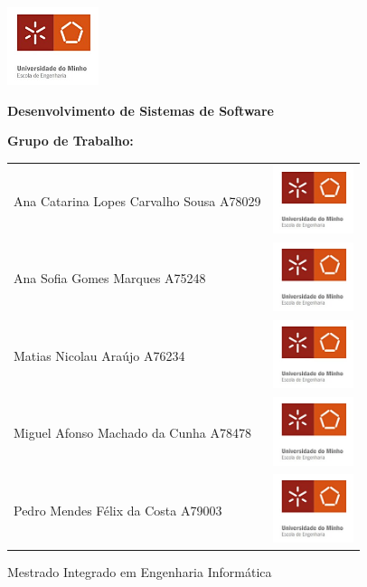 \documentclass[12pt,a4paper]{report}
\begin{document}
\begin{titlepage}
	\includegraphics[width=0.2\textwidth]{UMEng.jpeg}\par\vspace{1cm}
	\begin{center}
		\Large\textbf{Desenvolvimento de Sistemas de Software}\vspace{2cm}
	\end{center}

	\date{}
	\textbf{Grupo de Trabalho:}
	\begin{table}[h]
		\centering
		\label{my-label}
		\begin{tabular}{lr}
		Ana Catarina Lopes Carvalho Sousa A78029 & \includegraphics[height=2cm]{Nacional.png} \\
		Ana Sofia Gomes Marques A75248           & \includegraphics[height=2cm]{Sofia.png}    \\
		Matias Nicolau Araújo A76234             & \includegraphics[height=2cm]{Matias.png}   \\
		Miguel Afonso Machado da Cunha A78478    & \includegraphics[height=2cm]{Miguel.png}   \\
		Pedro Mendes Félix da Costa A79003       & \includegraphics[height=2cm]{Mendes.png}   \\
		\end{tabular}
	\end{table}
	\vfill
	Mestrado Integrado em Engenharia Informática
\end{titlepage}
\tableofcontents
\end{document}
